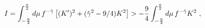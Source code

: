 \begin{equation}
I= \int^{\pi\over 2}_{-{\pi\over 2}} d\mu \, 
f^{-\tilde{\gamma}}  \left[(K')^2 + (\tilde{\gamma}^2
-9/4) K^2\right] > {-{9\over 4}}
\int^{\pi\over 2}_{-{\pi\over 2}} d\mu \, 
f^{-\tilde{\gamma}}  K^2\ ,
\label{anginta}
\end{equation}

